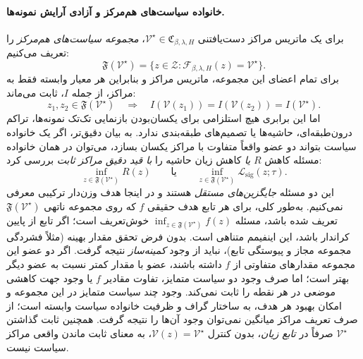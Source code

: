 \paragraph{خانواده سیاست‌های هم‌مرکز و آزادی آرایش نمونه‌ها.}
برای یک ماتریس مراکز دست‌یافتنی
$\mathcal V^\star\in\mathfrak C_{\beta,\lambda,H}$،
\emph{مجموعه سیاست‌های هم‌مرکز} را تعریف می‌کنیم:
\begin{equation}\label{eq:ch3-fixed-center-fiber}
\boxed{
\mathfrak F(\mathcal V^\star)
=\{z\in\mathcal Z:
\mathcal F_{\beta,\lambda,H}(z)=\mathcal V^\star\}.
}
\end{equation}
برای تمام اعضای این مجموعه،
ماتریس مراکز و بنابراین هر معیار
وابسته فقط به مراکز، از جمله $I$،
ثابت می‌ماند:
\begin{equation}\label{eq:ch3-fixed-center-I}
\boxed{
z_1,z_2\in\mathfrak F(\mathcal V^\star)
\quad\Longrightarrow\quad
I(\mathcal V(z_1))=I(\mathcal V(z_2))
=I(\mathcal V^\star).
}
\end{equation}
اما این برابری هیچ استلزامی برای
یکسان‌بودن بازنمایی تک‌تک نمونه‌ها،
تراکم درون‌طبقه‌ای، حاشیه‌ها
یا تصمیم‌های طبقه‌بندی ندارد.
به بیان دقیق‌تر، اگر یک خانواده سیاست
بتواند دو عضو واقعاً متفاوت
با مراکز یکسان بسازد،
می‌توان در همان خانواده
مسئله کاهش $R$ \emph{یا}
کاهش زیان حاشیه را
\emph{با قید دقیق مراکز ثابت}
بررسی کرد:
\begin{equation}\label{eq:ch3-fixed-center-objectives}
\boxed{
\inf_{z\in\mathfrak F(\mathcal V^\star)}R(z)
\qquad\text{یا}\qquad
\inf_{z\in\mathfrak F(\mathcal V^\star)}
\mathcal L_{\mathrm{sig}}(z;\tau).
}
\end{equation}
این دو مسئله \emph{جایگزین‌های مستقل}
هستند و در اینجا هدف وزن‌دار
ترکیبی معرفی نمی‌کنیم.
به‌طور کلی، برای هر تابع هدف حقیقی
$f$ که روی مجموعه ناتهی
$\mathfrak F(\mathcal V^\star)$ تعریف شده باشد،
مسئله $\inf_{z\in\mathfrak F(\mathcal V^\star)}f(z)$
خوش‌تعریف است؛ اگر تابع از پایین کراندار باشد،
این اینفیمم متناهی است. بدون فرض تحقق مقدار بهینه
(مثلاً فشردگی مجموعه مجاز و پیوستگی تابع)،
نباید از وجود \emph{کمینه‌ساز} نتیجه گرفت.
اگر دو عضو این مجموعه مقدارهای متفاوتی از $f$
داشته باشند، عضو با مقدار کمتر نسبت به عضو دیگر
بهتر است؛ اما صرف وجود دو سیاست متمایز،
تفاوت مقادیر $f$ یا وجود جهت کاهشی موضعی
در هر نقطه را ثابت نمی‌کند.
وجود چند سیاست متمایز در این
مجموعه و امکان بهبود هر هدف،
به ساختار گراف و ظرفیت
خانواده سیاست وابسته است؛
از صرف تعریف مراکز میانگین
نمی‌توان وجود آن‌ها را نتیجه گرفت.
همچنین ثابت گذاشتن
$\mathcal V^\star$ صرفاً در
\emph{تابع زیان}، بدون کنترل
$\mathcal V(z)=\mathcal V^\star$،
به معنای ثابت ماندن واقعی
مراکز سیاست نیست.



